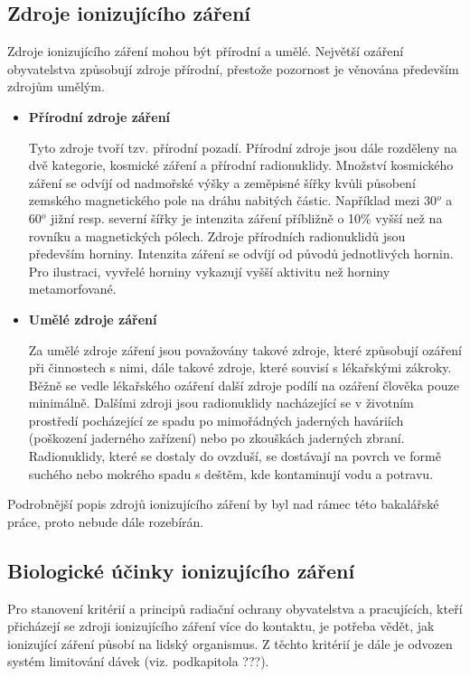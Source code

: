 \subsection{Zdroje ionizujícího záření} 
Zdroje ionizujícího záření mohou být přírodní a umělé. Největší ozáření obyvatelstva způsobují zdroje přírodní, přestože pozornost je věnována především zdrojům umělým. %

\begin{itemize}
	\item \textbf{Přírodní zdroje záření}
	
			Tyto zdroje tvoří tzv. přírodní pozadí. Přírodní zdroje jsou dále rozděleny na dvě kategorie, kosmické záření a přírodní radionuklidy. %
			Množství kosmického záření se odvíjí od nadmořské výšky a zeměpisné šířky kvůli působení zemského magnetického pole na dráhu nabitých částic. Například mezi 30$^{o}$ a 60$^{o}$ jižní resp. severní šířky je intenzita záření příbližně o 10\% vyšší než na rovníku a magnetických pólech. %
			Zdroje přírodních radionuklidů jsou především horniny. Intenzita záření  se odvíjí od původů jednotlivých hornin. Pro ilustraci, vyvřelé horniny vykazují vyšší aktivitu než horniny metamorfované. %
	
	\item \textbf{Umělé zdroje záření} %
	
			Za umělé zdroje záření jsou považovány takové zdroje, které způsobují ozáření při činnostech s nimi, dále takové zdroje, které souvisí s lékařskými zákroky. Běžně se vedle lékařského ozáření další zdroje podílí na ozáření člověka pouze minimálně. Dalšími zdroji jsou radionuklidy nacházející se v životním prostředí pocházející ze spadu po mimořádných jaderných haváriích (poškození jaderného zařízení) nebo po zkouškách jaderných zbraní. Radionuklidy, které se dostaly do ovzduší, se dostávají na povrch ve formě suchého nebo mokrého spadu s deštěm, kde kontaminují vodu a potravu. %
			
\end{itemize}

Podrobnější popis zdrojů ionizujícího záření by byl nad rámec této bakalářské práce, proto nebude dále rozebírán. 

\subsection{Biologické účinky ionizujícího záření}
Pro stanovení kritérií a principů radiační ochrany obyvatelstva a pracujících, kteří přicházejí se zdroji ionizujícího záření více do kontaktu, je potřeba vědět, jak ionizující záření působí na lidský organismus. Z těchto kritérií je dále je odvozen systém limitování dávek (viz. podkapitola ???). 

